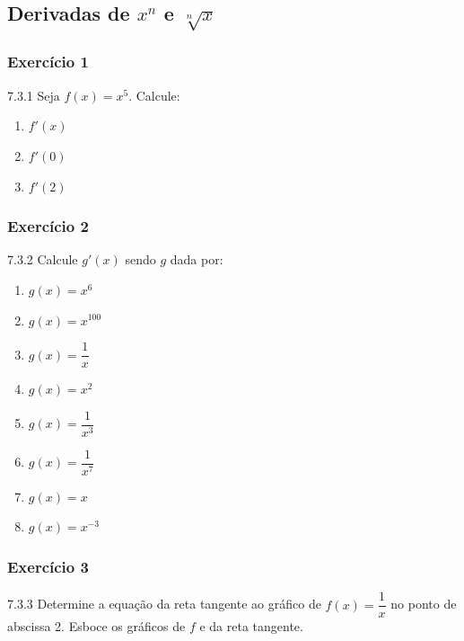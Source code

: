 \clearpage

\subsection{Derivadas de $x^n$ e $\sqrt[n]{x}$}

\subsubsection*{Exercício 1}
\begin{exercicio}[1]{7.3.1}
Seja $f(x) = x^5$. Calcule:
\begin{enumerate}[label=\alph*)]
    \item $f'(x)$
    \item $f'(0)$
    \item $f'(2)$
\end{enumerate}
\end{exercicio}

\subsubsection*{Exercício 2}
\begin{exercicio}[2]{7.3.2}
Calcule $g'(x)$ sendo $g$ dada por:
\begin{enumerate}[label=\alph*)]
    \item $g(x) = x^6$
    \item $g(x) = x^{100}$
    \item $g(x) = \dfrac{1}{x}$
    \item $g(x) = x^2$
    \item $g(x) = \dfrac{1}{x^3}$
    \item $g(x) = \dfrac{1}{x^7}$
    \item $g(x) = x$
    \item $g(x) = x^{-3}$
\end{enumerate}
\end{exercicio}

\subsubsection*{Exercício 3}
\begin{exercicio}[3]{7.3.3}
Determine a equação da reta tangente ao gráfico de $f(x) = \dfrac{1}{x}$ no ponto de abscissa 2. Esboce os gráficos de $f$ e da reta tangente.
\end{exercicio}

